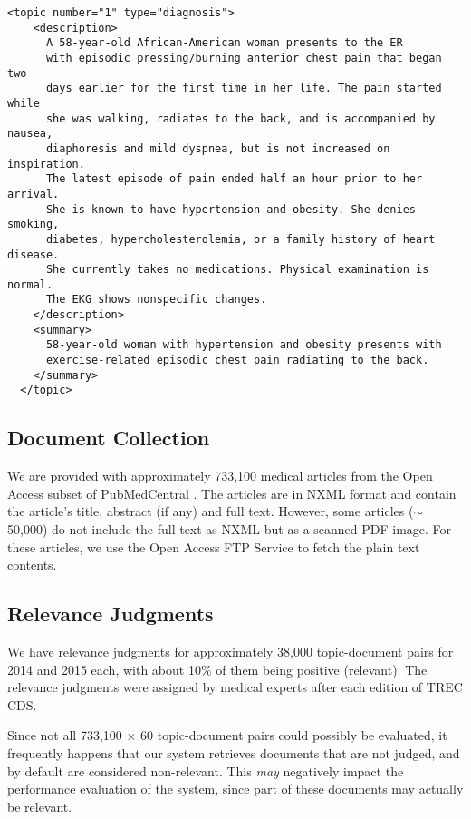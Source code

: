 \begin{Verbatim}[fontsize=\small]
  <topic number="1" type="diagnosis">
    <description>
      A 58-year-old African-American woman presents to the ER
      with episodic pressing/burning anterior chest pain that began two
      days earlier for the first time in her life. The pain started while
      she was walking, radiates to the back, and is accompanied by nausea,
      diaphoresis and mild dyspnea, but is not increased on inspiration.
      The latest episode of pain ended half an hour prior to her arrival.
      She is known to have hypertension and obesity. She denies smoking,
      diabetes, hypercholesterolemia, or a family history of heart disease.
      She currently takes no medications. Physical examination is normal.
      The EKG shows nonspecific changes.
    </description>
    <summary>
      58-year-old woman with hypertension and obesity presents with
      exercise-related episodic chest pain radiating to the back.
    </summary>
  </topic>
\end{Verbatim}

\subsection{Document Collection}
We are provided with approximately 733,100 medical articles from the Open Access subset of PubMedCentral \cite{oa}.
The articles are in NXML format
and contain the article's title, abstract (if any) and full text.
However, some articles ($\sim$ 50,000) do not include the full text
as NXML but as a scanned PDF image.
For these articles, we use the Open Access FTP Service \cite{oa-ftp} to fetch the plain text contents.

\subsection{Relevance Judgments}\label{qrels}
We have relevance judgments for approximately 38,000 topic-document pairs for 2014 and 2015 each, with about 10\% of them
being positive (relevant). The relevance judgments were assigned by medical experts after each edition of TREC CDS.

Since not all 733,100 $\times$ 60 topic-document pairs could possibly be evaluated, it frequently happens that our system retrieves documents
that are not judged, and by default are considered non-relevant. This \emph{may} negatively impact the performance evaluation of
the system, since part of these documents may actually be relevant.

